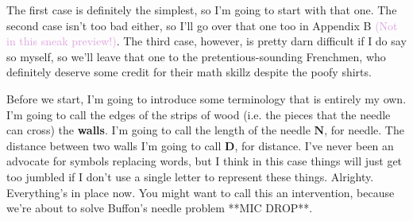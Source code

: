 \documentclass[11pt,titlepage]{article}
\begin{document}
The first case is definitely the simplest, so I'm going to start with that one. The second case isn't too bad either, so I'll go over that one too in Appendix B \textcolor{Plum}{(Not in this sneak preview!)}. The third case, however, is pretty darn difficult if I do say so myself, so we'll leave that one to the pretentious-sounding Frenchmen, who definitely deserve some credit for their math skillz despite the poofy shirts.

Before we start, I'm going to introduce some terminology that is entirely my own. I'm going to call the edges of the strips of wood (i.e. the pieces that the needle can cross) the \textbf{walls}. I'm going to call the length of the needle $\mathbf{N}$, for needle. The distance between two walls I'm going to call $\mathbf{D}$, for distance. I've never been an advocate for symbols replacing words, but I think in this case things will just get too jumbled if I don't use a single letter to represent these things. Alrighty. Everything's in place now. You might want to call this an intervention, because we're about to solve Buffon's needle problem **MIC DROP**.
\end{document}
